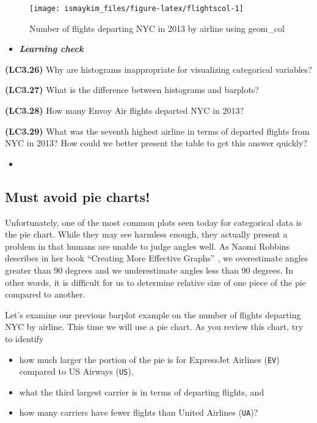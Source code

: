 \documentclass[12pt,]{krantz}
\providecommand{\tightlist}{%
  \setlength{\itemsep}{0pt}\setlength{\parskip}{0pt}}
\newenvironment{rmdblock}[1]
  {\begin{shaded*}
  \begin{itemize}
  \renewcommand{\labelitemi}{
    \raisebox{-.7\height}[0pt][0pt]{
    }
  }
  \item
  }
  {
  \end{itemize}
  \end{shaded*}
  }
\newenvironment{learncheck}
  {\begin{rmdblock}{warning}}
  {\end{rmdblock}}
\theoremstyle{definition}
\theoremstyle{definition}
\theoremstyle{definition}
\theoremstyle{remark}
\begin{document}
\begin{figure}

{\centering \texttt{[image: ismaykim\_files/figure-latex/flightscol-1]} 

}

\caption{Number of flights departing NYC in 2013 by airline using
geom\_col}\label{fig:flightscol}
\end{figure}

\begin{learncheck}
\textbf{\emph{Learning check}}
\end{learncheck}

\textbf{(LC3.26)} Why are histograms inappropriate for visualizing
categorical variables?

\textbf{(LC3.27)} What is the difference between histograms and
barplots?

\textbf{(LC3.28)} How many Envoy Air flights departed NYC in 2013?

\textbf{(LC3.29)} What was the seventh highest airline in terms of
departed flights from NYC in 2013? How could we better present the table
to get this answer quickly?

\begin{learncheck}

\end{learncheck}

\subsection{Must avoid pie charts!}\label{must-avoid-pie-charts}

Unfortunately, one of the most common plots seen today for categorical
data is the pie chart. While they may see harmless enough, they actually
present a problem in that humans are unable to judge angles well. As
Naomi Robbins describes in her book ``Creating More Effective Graphs''
\citep{robbins2013}, we overestimate angles greater than 90 degrees and
we underestimate angles less than 90 degrees. In other words, it is
difficult for us to determine relative size of one piece of the pie
compared to another.

Let's examine our previous barplot example on the number of flights
departing NYC by airline. This time we will use a pie chart. As you
review this chart, try to identify

\begin{itemize}
\tightlist
\item
  how much larger the portion of the pie is for ExpressJet Airlines
  (\texttt{EV}) compared to US Airways (\texttt{US}),
\item
  what the third largest carrier is in terms of departing flights, and
\item
  how many carriers have fewer flights than United Airlines
  (\texttt{UA})?
\end{itemize}
\end{document}
